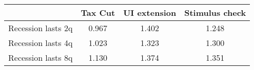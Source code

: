 \begin{tabular}{@{}lccc@{}} 
\toprule 
& Tax Cut    & UI extension    & Stimulus check    \\  \midrule 
Recession lasts 2q &0.967  & 1.402  & 1.248     \\ 
Recession lasts 4q &1.023  & 1.323  & 1.300     \\ 
Recession lasts 8q &1.130  & 1.374  & 1.351     \\ 
\end{tabular}  
